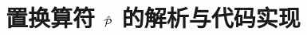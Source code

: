 %

\providecommand{\permmat}{\Pop}                              %
\providecommand{\Pijkl}{P_{(12)(3)}}                          %
\providecommand{\jacP}{\boldsymbol{p}}                        %
\providecommand{\jacQ}{\boldsymbol{q}}                        %
\providecommand{\jacPp}{\boldsymbol{p}'}
\providecommand{\jacQp}{\boldsymbol{q}'}
\providecommand{\pibar}{\bar{\boldsymbol{\pi}}}
\providecommand{\pibarone}{\tilde{\pi}_{1}}
\providecommand{\pibartwo}{\tilde{\pi}_{2}}
\providecommand{\Atilde}{\tilde{A}}
\providecommand{\Gtilde}{\tilde{G}}
\providecommand{\binPp}[1]{\Delta^{p'}_{#1}}
\providecommand{\binQp}[1]{\Delta^{q'}_{#1}}
\providecommand{\NxGL}{N_{x}}
\providecommand{\Nphi}{N_{\phi}}
\providecommand{\Lmax}{L_{\max}}
\providecommand{\NJP}{N_{J^\pi}}
\providecommand{\nineJ}[9]{\left\{\begin{array}{ccc}#1&#2&#3\\#4&#5&#6\\#7&#8&#9\end{array}\right\}}
\providecommand{\sixJ}[6]{\left\{\begin{array}{ccc}#1&#2&#3\\#4&#5&#6\end{array}\right\}}
\providecommand{\threeJ}[6]{\begin{pmatrix}#1&#2&#3\\#4&#5&#6\end{pmatrix}}
\providecommand{\WPstate}[3]{\ket{X^{#1}_{#2#3}}}             %
\providecommand{\WPstateP}[3]{\ket{X^{#1}_{#2#3}}}            %

\chapter{置换算符 \texorpdfstring{$\hat{\mathcal{P}}$}{P123} 的解析与代码实现}
\label{ch:09_permutation_p123}

